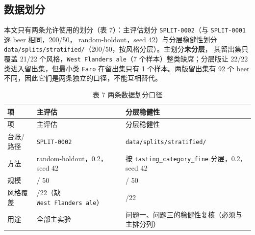 \documentclass[
  a4paper,12pt]{article}
\begin{document}
\subsection{数据划分}\label{ux6570ux636eux5212ux5206}

本文只有两条允许使用的划分（表 7）：主评估划分 \texttt{SPLIT-0002}（与
\texttt{SPLIT-0001} 逐 beer 相同，200/50， random-holdout，seed
42）与分层稳健性划分
\texttt{data/splits/stratified/}（200/50，按风格分层）。主划分\textbf{未分层}，
其留出集只覆盖 21/22 个风格，\texttt{West\ Flanders\ ale}（7
个样本）整类缺席；分层版让 22/22 类进入留出集，但最小类 \texttt{Faro}
在留出集只有 1 个样本。两版留出集有 92 个 beer
不同，因此它们是两条独立的口径，不能互相替代。

\begin{longtable}[]{@{}
  >{\raggedright\arraybackslash}p{}
  >{\raggedright\arraybackslash}p{}
  >{\raggedright\arraybackslash}p{}@{}}
\caption{表 7 两条数据划分口径}\tabularnewline
\toprule\noalign{}
\begin{minipage}[b]{\linewidth}\raggedright
项
\end{minipage} & \begin{minipage}[b]{\linewidth}\raggedright
主评估
\end{minipage} & \begin{minipage}[b]{\linewidth}\raggedright
分层稳健性
\end{minipage} \\
\midrule\noalign{}
\endfirsthead
\toprule\noalign{}
\begin{minipage}[b]{\linewidth}\raggedright
项
\end{minipage} & \begin{minipage}[b]{\linewidth}\raggedright
主评估
\end{minipage} & \begin{minipage}[b]{\linewidth}\raggedright
分层稳健性
\end{minipage} \\
\midrule\noalign{}
\endhead
\bottomrule\noalign{}
\endlastfoot
台账/路径 & \texttt{SPLIT-0002} & \texttt{data/splits/stratified/} \\
方法 & random-holdout，0.2，seed 42 & 按
\texttt{tasting\_category\_fine} 分层，0.2，seed 42 \\
规模 & 200 / 50 & 200 / 50 \\
风格覆盖 & 21/22（缺 \texttt{West\ Flanders\ ale}） & 22/22 \\
用途 & 全部主实验 & 问题一、问题三的稳健性复核（必须与主排分列） \\
\end{longtable}
\end{document}
